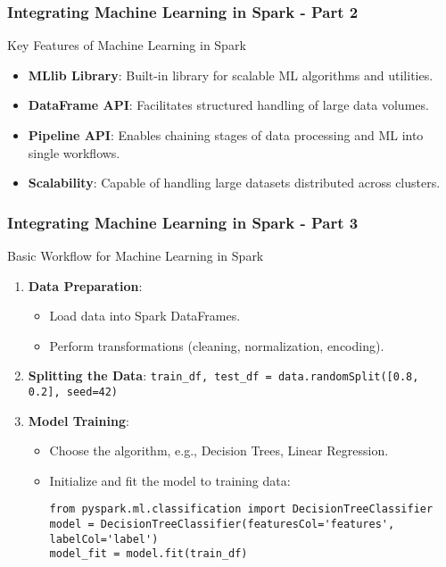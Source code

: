 \documentclass[aspectratio=169]{beamer}
\begin{document}
\begin{frame}[fragile]
    \frametitle{Integrating Machine Learning in Spark - Part 2}
    \begin{block}{Key Features of Machine Learning in Spark}
        \begin{itemize}
            \item \textbf{MLlib Library}: Built-in library for scalable ML algorithms and utilities.
            \item \textbf{DataFrame API}: Facilitates structured handling of large data volumes.
            \item \textbf{Pipeline API}: Enables chaining stages of data processing and ML into single workflows.
            \item \textbf{Scalability}: Capable of handling large datasets distributed across clusters.
        \end{itemize}
    \end{block}
\end{frame}

\begin{frame}[fragile]
    \frametitle{Integrating Machine Learning in Spark - Part 3}
    \begin{block}{Basic Workflow for Machine Learning in Spark}
        \begin{enumerate}
            \item \textbf{Data Preparation}:
                \begin{itemize}
                    \item Load data into Spark DataFrames.
                    \item Perform transformations (cleaning, normalization, encoding).
                \end{itemize}
            \item \textbf{Splitting the Data}:
                \texttt{train\_df, test\_df = data.randomSplit([0.8, 0.2], seed=42)}
            \item \textbf{Model Training}:
                \begin{itemize}
                    \item Choose the algorithm, e.g., Decision Trees, Linear Regression.
                    \item Initialize and fit the model to training data:
                    \begin{lstlisting}
from pyspark.ml.classification import DecisionTreeClassifier
model = DecisionTreeClassifier(featuresCol='features', labelCol='label')
model_fit = model.fit(train_df)
                    \end{lstlisting}
                \end{itemize}
        \end{enumerate}
    \end{block}
\end{frame}
\end{document}
